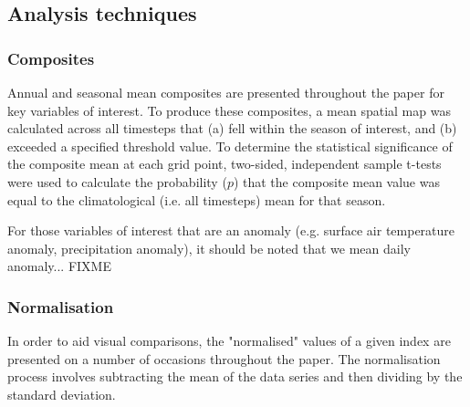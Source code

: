 \subsection{Analysis techniques}

\subsubsection{Composites}
Annual and seasonal mean composites are presented throughout the paper for key variables of interest. To produce these composites, a mean spatial map was calculated across all timesteps that (a) fell within the season of interest, and (b) exceeded a specified threshold value. To determine the statistical significance of the composite mean at each grid point, two-sided, independent sample t-tests were used to calculate the probability ($p$) that the composite mean value was equal to the climatological (i.e. all timesteps) mean for that season.    

For those variables of interest that are an anomaly (e.g. surface air temperature anomaly, precipitation anomaly), it should be noted that we mean daily anomaly... FIXME

\subsubsection{Normalisation}
In order to aid visual comparisons, the "normalised" values of a given index are presented on a number of occasions throughout the paper. The normalisation process involves subtracting the mean of the data series and then dividing by the standard deviation. 




